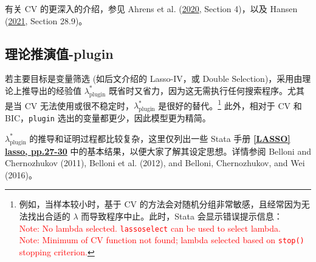 有关 CV 的更深入的介绍，参见 Ahrens et al. (\href{http://sci-hub.ren/10.1177/1536867X20909697}{2020}, Section 4)，以及 Hansen (\href{https://www.ssc.wisc.edu/~bhansen/econometrics/Econometrics.pdf}{2021}, Section 28.9)。


\subsection{理论推演值-plugin}\label{sec:lasso-plugin}



若主要目标是变量筛选 (如后文介绍的 Lasso-IV，或 Double Selection)，采用由理论上推导出的经验值 $\lambda_{\text{plugin}}^*$ 既省时又省力，因为这无需执行任何搜索程序。尤其是当 CV 无法使用或很不稳定时，$\lambda_{\text{plugin}}^*$ 是很好的替代。\footnote{%
   例如，当样本较小时，基于 CV 的方法会对随机分组非常敏感，且经常因为无法找出合适的 $\lambda$ 而导致程序中止。此时，Stata 会显示错误提示信息：{\\ \textcolor{red}{Note: No lambda selected. \texttt{lassoselect} can be used to select lambda. \\
   Note: Minimum of CV function not found; lambda selected based on \texttt{stop()} stopping criterion.}}}
此外，相对于 CV 和 BIC，\texttt{plugin} 选出的变量都更少，因此模型更为精简。


$\lambda_{\text{plugin}}^*$ 的推导和证明过程都比较复杂，这里仅列出一些 Stata 手册 \href{https://www.stata.com/manuals/lassolasso.pdf}{\bfseries{[\MakeUppercase{lasso}] lasso, pp.27-30}} 
中的基本结果，以便大家了解其设定思想。详情参阅 Belloni and Chernozhukov (2011), Belloni et al. (2012), and Belloni, Chernozhukov, and Wei (2016)。

